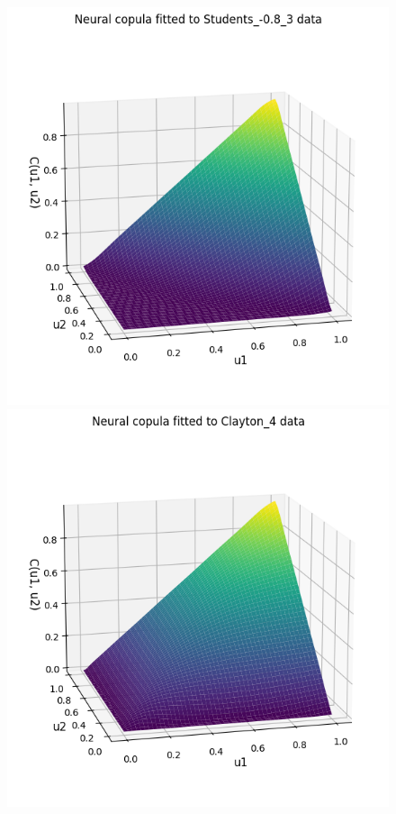 \documentclass[%
a4paper,							
11pt,								
bibliography=totoc,						
abstracton=true					
]
{scrartcl}
\theoremstyle{plain}
\theoremstyle{definition}
\theoremstyle{remark}
\newcommand{\1}{\mathbbm{1}}
\begin{document}
\begin{figure}[H]
\begin{minipage}{0.49\textwidth}
    \end{minipage}
    \vfill
    \begin{minipage}{0.49\textwidth}
        \centering
        \includegraphics[width=\textwidth]{5ResultsDiscussion/pictures/PortfolioTest/NCPort3.png}
    \end{minipage}
    \hfill
    \begin{minipage}{0.49\textwidth}
        \centering
        \includegraphics[width=\textwidth]{5ResultsDiscussion/pictures/PortfolioTest/NCPort4.png}
    \end{minipage}


\end{figure}
\end{document}
